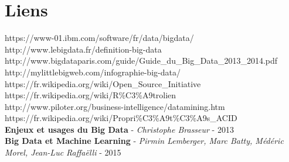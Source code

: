 \documentclass[12pt]{article}
\begin{document}
\section*{Liens}
https://www-01.ibm.com/software/fr/data/bigdata/ \\
http://www.lebigdata.fr/definition-big-data \\
http://www.bigdataparis.com/guide/Guide\_du\_Big\_Data\_2013\_2014.pdf \\
http://mylittlebigweb.com/infographie-big-data/ \\
https://fr.wikipedia.org/wiki/Open\_Source\_Initiative \\
https://fr.wikipedia.org/wiki/R\%C3\%A9trolien \\
http://www.piloter.org/business-intelligence/datamining.htm \\
https://fr.wikipedia.org/wiki/Propri\%C3\%A9t\%C3\%A9s\_ACID \\
\textbf{Enjeux et usages du Big Data} - \textit{Christophe Brasseur} - 2013 \\
\textbf{Big Data et Machine Learning} - \textit{Pirmin Lemberger, Marc Batty, Médéric Morel, Jean-Luc Raffaëlli} - 2015
\end{document}

